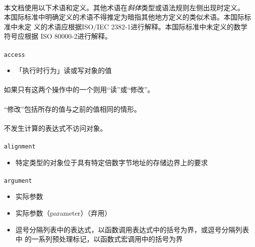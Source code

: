 
\paragraph{}
本文档使用以下术语和定义。其他术语在\textit{斜体}类型或语法规则左侧出现时定义。
本国际标准中明确定义的术语不得推定为暗指其他地方定义的类似术语。本国际标准中未定
义的术语应根据ISO/IEC 2382-1进行解释。本国际标准中未定义的数学符号应根据
ISO 80000-2进行解释。


\paragraph{}
\texttt{access}
\begin{itemize}
  \item[]{「执行时行为」读或写对象的值}
\end{itemize}

\paragraph{}
\notes 如果只有这两个操作中的一个则用``读''或``修改''。

\paragraph{}
\notes ``修改''包括所存的值与之前的值相同的情形。

\paragraph{}
\notes 不发生计算的表达式不访问对象。

\paragraph{}
\texttt{alignment}
\begin{itemize}
  \item[]{特定类型的对象位于具有特定倍数字节地址的存储边界上的要求}
\end{itemize}

\paragraph{}
\texttt{argument}
\begin{itemize}
  \item[]{实际参数}
  \item[]{实际参数（parameter）（弃用）}
  \item[]{逗号分隔列表中的表达式，以函数调用表达式中的括号为界，或逗号分隔列表中
    的一系列预处理标记，以函数式宏调用中的括号为界}
\end{itemize}

